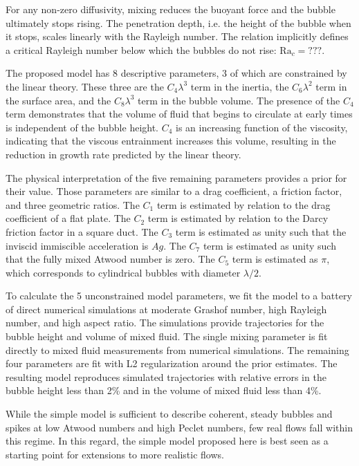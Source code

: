For any non-zero diffusivity, mixing reduces the buoyant force and the bubble ultimately stops rising.
The penetration depth, i.e. the height of the bubble when it stops, scales linearly with the Rayleigh number.
The relation implicitly defines a critical Rayleigh number below which the bubbles do not rise: $\text{Ra}_c = ???$.

The proposed model has 8 descriptive parameters, 3 of which are constrained by the linear theory.
These three are the $C_4 \lambda^3$ term in the inertia, the $C_6 \lambda^2$ term in the surface area, and the $C_8 \lambda^3$ term in the bubble volume.
The presence of the $C_4$ term demonstrates that the volume of fluid that begins to circulate at early times is independent of the bubble height.
$C_4$ is an increasing function of the viscosity, indicating that the viscous entrainment increases this volume, resulting in the reduction in growth rate predicted by the linear theory.

The physical interpretation of the five remaining parameters provides a prior for their value.
Those parameters are similar to a drag coefficient, a friction factor, and three geometric ratios.
The $C_1$ term is estimated by relation to the drag coefficient of a flat plate.
The $C_2$ term is estimated by relation to the Darcy friction factor in a square duct.
The $C_3$ term is estimated as unity such that the inviscid immiscible acceleration is $Ag$.
The $C_7$ term is estimated as unity such that the fully mixed Atwood number is zero.
The $C_5$ term is estimated as $\pi$, which corresponds to cylindrical bubbles with diameter $\lambda / 2$.

To calculate the 5 unconstrained model parameters, we fit the model to a battery of direct numerical simulations at moderate Grashof number, high Rayleigh number, and high aspect ratio.
The simulations provide trajectories for the bubble height and volume of mixed fluid.
The single mixing parameter is fit directly to mixed fluid measurements from numerical simulations.
The remaining four parameters are fit with L2 regularization around the prior estimates.
The resulting model reproduces simulated trajectories with relative errors in the bubble height less than 2\% and in the volume of mixed fluid less than 4\%.





While the simple model is sufficient to describe coherent, steady bubbles and spikes at low Atwood numbers and high Peclet numbers, few real flows fall within this regime.
In this regard, the simple model proposed here is best seen as a starting point for extensions to more realistic flows.
